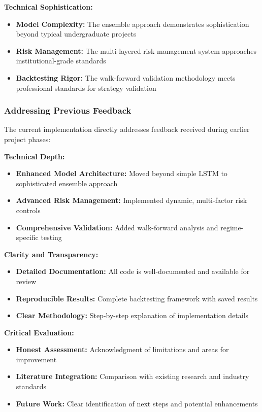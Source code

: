 \documentclass[conference]{IEEEtran}
\begin{document}
\textbf{Technical Sophistication:}
\begin{itemize}
    \item \textbf{Model Complexity:} The ensemble approach demonstrates sophistication beyond typical undergraduate projects
    \item \textbf{Risk Management:} The multi-layered risk management system approaches institutional-grade standards
    \item \textbf{Backtesting Rigor:} The walk-forward validation methodology meets professional standards for strategy validation
\end{itemize}

\subsubsection{Addressing Previous Feedback}
The current implementation directly addresses feedback received during earlier project phases:

\textbf{Technical Depth:}
\begin{itemize}
    \item \textbf{Enhanced Model Architecture:} Moved beyond simple LSTM to sophisticated ensemble approach
    \item \textbf{Advanced Risk Management:} Implemented dynamic, multi-factor risk controls
    \item \textbf{Comprehensive Validation:} Added walk-forward analysis and regime-specific testing
\end{itemize}

\textbf{Clarity and Transparency:}
\begin{itemize}
    \item \textbf{Detailed Documentation:} All code is well-documented and available for review
    \item \textbf{Reproducible Results:} Complete backtesting framework with saved results
    \item \textbf{Clear Methodology:} Step-by-step explanation of implementation details
\end{itemize}

\textbf{Critical Evaluation:}
\begin{itemize}
    \item \textbf{Honest Assessment:} Acknowledgment of limitations and areas for improvement
    \item \textbf{Literature Integration:} Comparison with existing research and industry standards
    \item \textbf{Future Work:} Clear identification of next steps and potential enhancements
\end{itemize}
\end{document}
